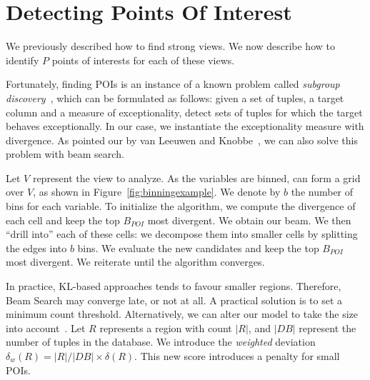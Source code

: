 \section{Detecting Points Of Interest}
\label{sec:detec}

We previously described how to find strong views. We now
describe how to identify $P$ points of interests for each of these views. 

Fortunately, finding POIs is an instance of a known problem called
\emph{subgroup discovery}~\cite{klosgen1996explora, wrobel1997algorithm}, which
can be formulated as follows: given a set of tuples, a target column and a
measure of exceptionality, detect sets of tuples for which the target behaves
exceptionally. In our case, we instantiate the exceptionality measure
with divergence. As pointed our by van Leeuwen and Knobbe~\cite{van2011non}, we
can also solve this problem with beam search.

Let $V$ represent the view to analyze. As the variables are binned, can form a
grid over $V$, as shown in Figure~\ref{fig:binningexample}. We denote by $b$
the number of bins for each variable. To initialize the algorithm, we compute
the divergence of each cell and keep the top $B_{POI}$ most divergent. We
obtain our beam. We then ``drill into'' each of these cells: we decompose them
into smaller cells by splitting the edges into $b$ bins. We evaluate the new
candidates and keep the top $B_{POI}$ most divergent. We reiterate until the
algorithm converges.

In practice, KL-based approaches tends to favour smaller regions. Therefore,
Beam Search may converge late, or not at all. A practical solution is to set a
minimum count threshold. Alternatively, we can alter our model to take the size
into account~\cite{van2011non}. Let $R$ represents a region with count $|R|$,
and $|DB|$ represent the number of tuples in the database. We introduce the
\emph{weighted} deviation $\delta_w(R) = |R|/|DB| \times \delta(R)$. This new
score introduces a penalty for small POIs.







